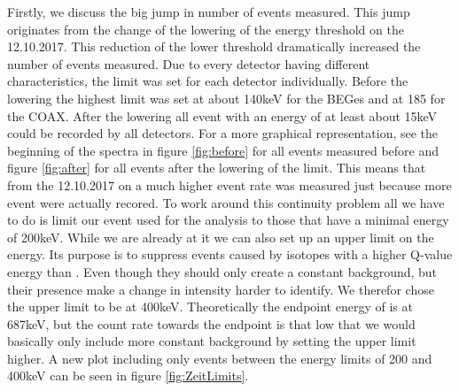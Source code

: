 Firstly, we discuss the big jump in number of events measured.
This jump originates from the change of the lowering of the energy threshold on the 12.10.2017.
This reduction of the lower threshold dramatically increased the number of events measured.
Due to every detector having different characteristics, the limit was set for each detector individually.
Before the lowering the highest limit was set at about 140keV for the BEGes and at 185 for the COAX.
After the lowering all event with an energy of at least about 15keV could be recorded by all detectors.
For a more graphical representation, see the beginning of the spectra in figure \ref{fig:before} for all events measured before and figure \ref{fig:after} for all events after the lowering of the limit. 
This means that from the 12.10.2017 on a much higher event rate was measured just because more event were actually recored.
To work around this continuity problem all we have to do is limit our event used for the analysis to those that have a minimal energy of 200keV. 
While we are already at it we can also set up an upper limit on the energy.
Its purpose is to suppress events caused by isotopes with a higher Q-value energy than \Kr.
Even though they should only create a constant background, but their presence make a change in intensity harder to identify.
We therefor chose the upper limit to be at 400keV.
Theoretically the endpoint energy of \Kr is at 687keV, but the count rate towards the endpoint is that low that we would basically only include more constant background by setting the upper limit higher.
A new plot including only events between the energy limits of 200 and 400keV can be seen in figure \ref{fig:ZeitLimits}.
\\
